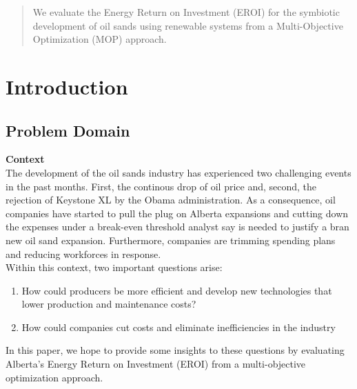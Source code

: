 \documentclass[12pt]{article}
\begin{document}
\lhead{}
\chead{\color{ashgrey}{DRAFT 2015-08-09}}
\rhead{}
\lfoot{}
\maketitle

\begin{abstract}
We evaluate the Energy Return on Investment (EROI) for the symbiotic development of oil sands using renewable systems  from a Multi-Objective Optimization (MOP) approach. 
\end{abstract}

\tableofcontents
\newpage

\section{Introduction}

\subsection{Problem Domain}

{\bf Context} \\

The development of the oil sands industry has experienced two challenging events in the past months. First, the continous drop of oil price and, second,  the rejection of Keystone XL by the Obama administration. As a consequence, oil companies have started to pull the plug on Alberta expansions and cutting down the expenses under a break-even threshold analyst say is needed to justify a bran new oil sand expansion. Furthermore, companies are trimming spending plans and reducing workforces in response.  \\

Within this context, two important questions arise: 
  \begin{enumerate}
  \item How could producers be more efficient and develop new technologies that lower production and maintenance costs?
  \item How could companies cut costs and eliminate inefficiencies in the industry
  \end{enumerate}

In this paper, we hope to provide some insights to these questions by evaluating Alberta's Energy Return on Investment (EROI) from a multi-objective optimization approach. \\
\end{document}
